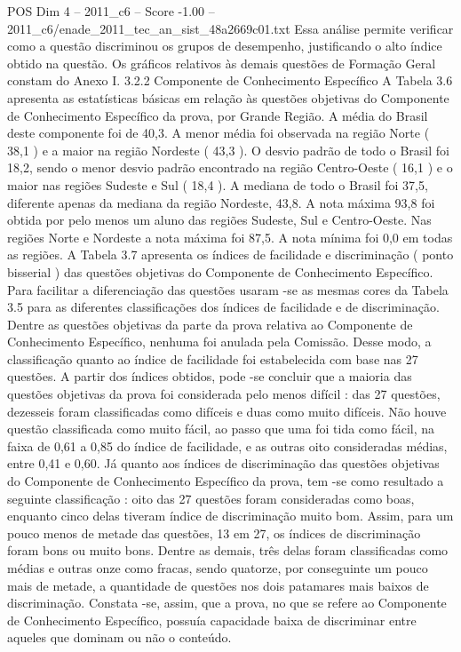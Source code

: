 \begin{textsample}{POS Dim 4 – 2011\_c6 – Score -1.00 – 2011\_c6/enade\_2011\_tec\_an\_sist\_48a2669c01.txt}
Essa análise permite verificar como a questão discriminou os grupos de desempenho, justificando o alto índice obtido na questão.
Os gráficos relativos às demais questões de Formação Geral constam do Anexo I. 3.2.2 Componente de Conhecimento Específico A Tabela 3.6 apresenta as estatísticas básicas em relação às questões objetivas do Componente de Conhecimento Específico da prova, por Grande Região.
A média do Brasil deste componente foi de 40,3.
A menor média foi observada na região Norte ( 38,1 ) e a maior na região Nordeste ( 43,3 ).
O desvio padrão de todo o Brasil foi 18,2, sendo o menor desvio padrão encontrado na região Centro-Oeste ( 16,1 ) e o maior nas regiões Sudeste e Sul ( 18,4 ).
A mediana de todo o Brasil foi 37,5, diferente apenas da mediana da região Nordeste, 43,8.
A nota máxima 93,8 foi obtida por pelo menos um aluno das regiões Sudeste, Sul e Centro-Oeste.
Nas regiões Norte e Nordeste a nota máxima foi 87,5.
A nota mínima foi 0,0 em todas as regiões.
A Tabela 3.7 apresenta os índices de facilidade e discriminação ( ponto bisserial ) das questões objetivas do Componente de Conhecimento Específico.
Para facilitar a diferenciação das questões usaram -se as mesmas cores da Tabela 3.5 para as diferentes classificações dos índices de facilidade e de discriminação.
Dentre as questões objetivas da parte da prova relativa ao Componente de Conhecimento Específico, nenhuma foi anulada pela Comissão.
Desse modo, a classificação quanto ao índice de facilidade foi estabelecida com base nas 27 questões.
A partir dos índices obtidos, pode -se concluir que a maioria das questões objetivas da prova foi considerada pelo menos difícil : das 27 questões, dezesseis foram classificadas como difíceis e duas como muito difíceis.
Não houve questão classificada como muito fácil, ao passo que uma foi tida como fácil, na faixa de 0,61 a 0,85 do índice de facilidade, e as outras oito consideradas médias, entre 0,41 e 0,60.
Já quanto aos índices de discriminação das questões objetivas do Componente de Conhecimento Específico da prova, tem -se como resultado a seguinte classificação : oito das 27 questões foram consideradas como boas, enquanto cinco delas tiveram índice de discriminação muito bom.
Assim, para um pouco menos de metade das questões, 13 em 27, os índices de discriminação foram bons ou muito bons.
Dentre as demais, três delas foram classificadas como médias e outras onze como fracas, sendo quatorze, por conseguinte um pouco mais de metade, a quantidade de questões nos dois patamares mais baixos de discriminação.
Constata -se, assim, que a prova, no que se refere ao Componente de Conhecimento Específico, possuía capacidade baixa de discriminar entre aqueles que dominam ou não o conteúdo.

\end{textsample}

